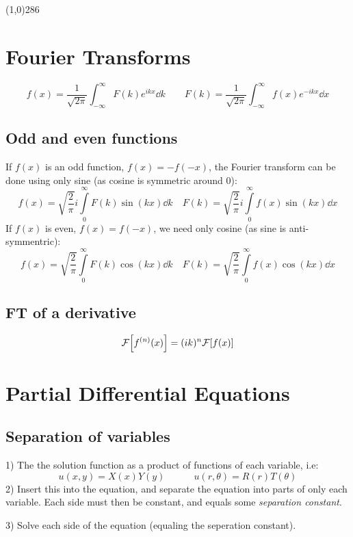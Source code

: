 \documentclass[10pt,a4paper]{article}
\renewcommand{\exp}{e^}
\newcommand{\infint}{\int_{-\infty}^{\infty}}
\newcommand{\holine}{\line(1,0){286}}
\begin{document}
\begin{multicols}{2}
\holine
\section*{Fourier Transforms}
\[
    f(x) = \frac{1}{\sqrt{2\pi}} \infint F(k) \exp{ikx} \dd{k} \quad\quad
    F(k) = \frac{1}{\sqrt{2\pi}} \infint f(x) \exp{-ikx} \dd{x}
\]

\subsection*{Odd and even functions}
If $f(x)$ is an odd function, $f(x) = -f(-x)$, the Fourier transform can be done using only sine (as cosine is symmetric around 0):
\[
    f(x) = \sqrt{\frac{2}{\pi}} i\int\limits_0^{\infty} F(k) \sin(k x) \dd{k}   \quad
    F(k) = \sqrt{\frac{2}{\pi}} i\int\limits_0^{\infty} f(x) \sin(k x) \dd{x}
\]
If $f(x)$ is even, $f(x) = f(-x)$, we need only cosine (as sine is anti-symmentric):
\[
    f(x) = \sqrt{\frac{2}{\pi}} \int\limits_0^{\infty} F(k) \cos(k x) \dd{k}   \quad
    F(k) = \sqrt{\frac{2}{\pi}} \int\limits_0^{\infty} f(x) \cos(k x) \dd{x}
\]


\subsection*{FT of a derivative}
\[
    \mathcal{F}\qty[f^{(n)}(x)] = (ik)^n \mathcal{F}\qty[f(x)]
\]


    




\newpage
\section*{Partial Differential Equations}
\subsection*{Separation of variables}
1) The the solution function as a product of functions of each variable, i.e:
\[
    u(x,y) = X(x)Y(y) \quad\quad\quad u(r, \theta) = R(r)T(\theta)
\]
2) Insert this into the equation, and separate the equation into parts of only each variable. Each side must then be constant, and equals some \textit{separation constant}.

3) Solve each side of the equation (equaling the seperation constant).


\end{multicols}
\end{document}
